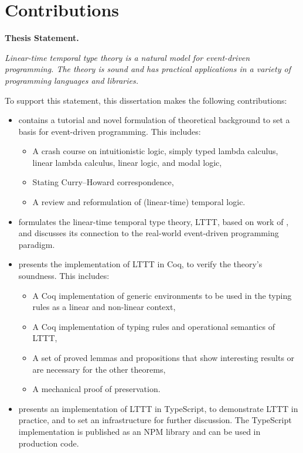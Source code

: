 \section{Contributions}

\textbf{Thesis Statement.}

\textit{Linear-time temporal type theory is a natural model for event-driven programming. The theory is sound and has practical applications in a variety of programming languages and libraries.}

To support this statement, this dissertation makes the following contributions:

\begin{itemize}
    \item {} contains a tutorial and novel formulation of theoretical background to set a basis for event-driven programming. This includes:
    \begin{itemize}
        \item A crash course on intuitionistic logic, simply typed lambda calculus, linear lambda calculus, linear logic, and modal logic,
        \item Stating Curry--Howard correspondence,
        \item A review and reformulation of (linear-time) temporal logic.
    \end{itemize}
    \item {} formulates the linear-time temporal type theory, LTTT, based on work of \cite{Paykin2016TheEO}, and discusses its connection to the real-world event-driven programming paradigm.
    \item {} presents the implementation of LTTT in Coq, to verify the theory's soundness. This includes:
    \begin{itemize}
        \item A Coq implementation of generic environments to be used in the typing rules as a linear and non-linear context,
        \item A Coq implementation of typing rules and operational semantics of LTTT,
        \item A set of proved lemmas and propositions that show interesting results or are necessary for the other theorems,
        \item A mechanical proof of preservation.
    \end{itemize}
    \item {} presents an implementation of LTTT in TypeScript, to demonstrate LTTT in practice, and to set an infrastructure for further discussion. The TypeScript implementation is published as an NPM library and can be used in production code.
\end{itemize}
